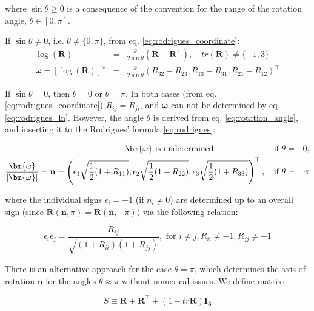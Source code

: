 \documentclass[a4paper,11pt]{report}
\newcommand{\W}{{\bm{\omega}}}
\begin{document}
\noindent where $\sin \theta \geq 0$ is a consequence of the 
convention for the range of the rotation angle, $\theta \in [0, \pi]$.

If $\sin \theta \neq 0$, i.e. $\theta \neq \{0, \pi\}$, from eq. 
\ref{eq:rodrigues_coordinate}:
\begin{eqnarray}
\label{eq:rodrigues_ln}
\log(\mathbf{R}) &=& \frac{\theta}{2\sin \theta} \left( \mathbf{R} - 
\mathbf{R}^\top
\right), \quad tr(\mathbf{R}) \neq \{-1, 3\} \nonumber \\
\label{eq:log_so3}
 \W = \left[ \log(\mathbf{R}) \right]^\vee &=& \frac{\theta}{2 \sin 
 \theta} (R_{32} - R_{23}, R_{13} - R_{31}, R_{21} - R_{12})^\top 
\end{eqnarray}

If $\sin \theta = 0$, then $\theta = 0$ or $\theta = \pi$. In both 
cases (from eq. \ref{eq:rodrigues_coordinate}) $R_{ij} = R_{ji}$, and 
$\W$ can not be determined by eq. \ref{eq:rodrigues_ln}. However, the 
angle $\theta$ is derived from eq. \ref{eq:rotation_angle}, and 
inserting it to the Rodrigues' formula \ref{eq:rodrigues}:

\begin{eqnarray}
\label{eq:rodrigues_ln_special}
\W \text{ is undetermined} \hspace{0.2\textwidth} \text{ if } \theta 
&=& 0, \nonumber \\
\frac{\W}{|\W|} = \mathbf{n} = \left(\epsilon_1 \sqrt{\frac{1}{2}(1 + 
R_{11})}, \epsilon_2 \sqrt{\frac{1}{2}(1 + R_{22})}, \epsilon_3 
\sqrt{\frac{1}{2}(1 + R_{33})} \right)^\top, \quad \text{if } \theta 
&=& \pi
\end{eqnarray}

\noindent where the individual signs $\epsilon_i = \pm 1$ (if $n_i 
\neq 0$) are determined up to an overall sign (since $\mathbf{R}
(\mathbf{n}, \pi) = \mathbf{R}(\mathbf{n}, -\pi)$) via the following 
relation:

\begin{equation}
\label{eq:rodrigues_ln_special_sign}
\epsilon_i \epsilon_j = \frac{R_{ij}}{\sqrt{(1 + R_{ii})(1 + 
R_{jj})}}, \text{ for } i \neq j, R_{ii} \neq -1, R_{jj} \neq -1 
\end{equation}

There is an alternative approach for the case $\theta = \pi$, which 
determines the axis of rotation $\mathbf{n}$ for the angles $\theta 
\approx \pi$ without numerical issues. We define matrix:

\begin{equation}
\label{eq:matrix_for_axis_around_pi}
S \equiv \mathbf{R} + \mathbf{R}^\top + (1 - tr\mathbf{R}) 
\mathbf{I_3}
\end{equation}
\end{document}
